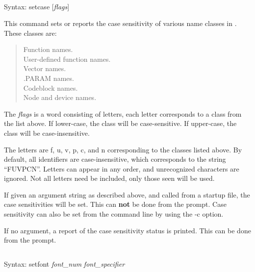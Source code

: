 \subsection{}


Syntax: {\vt setcase} [{\it flags\/}]

This command sets or reports the case sensitivity of various name
classes in {\WRspice}.  These classes are:

\begin{quote}
Function names.\\
User-defined function names.\\
Vector names.\\
.PARAM names.\\
Codeblock names.\\
Node and device names.\\
\end{quote}

The {\it flags} is a word consisting of letters, each letter
corresponds to a class from the list above.  If lower-case, the class
will be case-sensitive.  If upper-case, the class will be
case-insensitive.

The letters are {\vt f}, {\vt u}, {\vt v}, {\vt p}, {\vt c}, and {\vt
n} corresponding to the classes listed above.  By default, all
{\WRspice} identifiers are case-insensitive, which corresponds to the
string ``{\vt FUVPCN}''.  Letters can appear in any order, and
unrecognized characters are ignored.  Not all letters need be
included, only those seen will be used.

If given an argument string as described above, and called from a
startup file, the case sensitivities will be set.  This can {\bf not}
be done from the {\WRspice} prompt.  Case sensitivity can also be set
from the command line by using the {\vt -c} option.

If no argument, a report of the case sensitivity status is printed. 
This can be done from the {\WRspice} prompt.


\subsection{}


Syntax: {\vt setfont} {\it font\_num} {\it font\_specifier}

